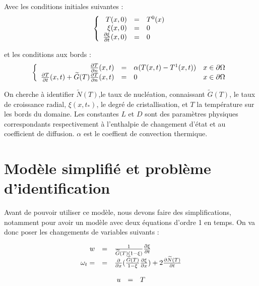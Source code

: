 \documentclass[a4paper,10pt]{article}
\newcommand{\pd}[2]{\frac{\partial #1}{\partial #2}}
\begin{document}
Avec les conditions initiales suivantes :
\[
\left\{
\begin{array}{r c l}
T(x,0)		&=& 		T^ 0(x)		\\
\xi(x,0)		&=&		0			\\
\frac{\partial\xi}{\partial t}(x,0) 		&=&		0		\\
\end{array}
\right.
\]

et les conditions aux bords :
\[
\left\{
\begin{array}{r c l r}
\frac{\partial T}{\partial n}(x, t)		&=&		\alpha (T(x,t) -T^1(x,t)) & x \in \partial \Omega\\

\frac{\partial T}{\partial t}(x, t)	+ \widetilde{G}(T) \frac{\partial T}{\partial n}(x, t)	&=&		0	 & x \in \partial \Omega\\


\end{array}
\right.
\]

On cherche à identifier $\widetilde{N}(T)$,le taux de nucléation, connaissant $\widetilde{G}(T)$, le taux de croissance radial, $\xi(x, t_*)$, le degré de cristallisation, et $T$ la température sur les bords du domaine. Les constantes $L$ et $D$ sont des paramètres physiques correspondants respectivement à l'enthalpie de changement d'état et au coefficient de diffusion. $\alpha$ est le coeffient de convection thermique.

\section{Modèle simplifié  et problème d'identification}

Avant de pouvoir utiliser ce modèle, nous devons faire des simplifications, notamment pour avoir un modèle avec deux équations d'ordre 1 en temps. On va donc poser les changements de variables suivants :

\[
\begin{array}{r c l}
w & = & \frac{1}{\widetilde{G}(T)(1-\xi)}\pd{\xi}{t} \\
\omega_t= & = &
	 \pd{}{x}(\frac{\widetilde{G}(T)}{1-\xi}\pd{\xi}{x}) + 2 \pd{\widetilde{N}(T)}{t}
\end{array}
\]


\[
\begin{array}{r c l}
u & = &  T \\
\end{array}
\]
\end{document}
